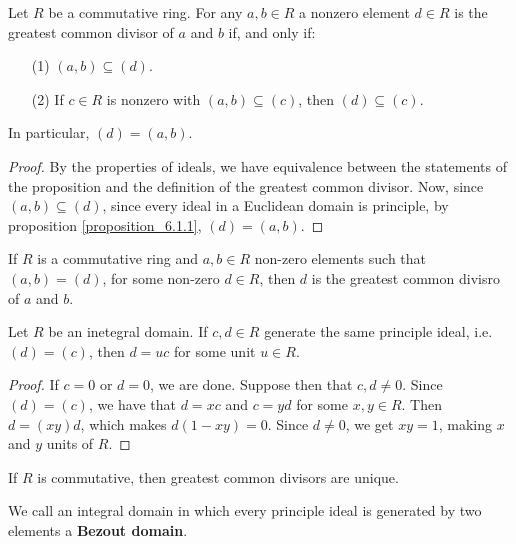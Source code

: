 \begin{proposition}\label{proposition_6.1.2}
  Let $R$ be a commutative ring. For any $a,b \in R$ a nonzero element  $d \in
  R$ is the greatest common divisor of $a$ and $b$ if, and only if:
  \begin{enumerate}
    \item[(1)] $(a,b) \subseteq (d)$.

    \item[(2)] If $c \in R$ is nonzero with $(a,b) \subseteq (c)$, then $(d)
      \subseteq (c)$.
  \end{enumerate}
  In particular, $(d)=(a,b)$.
\end{proposition}
\begin{proof}
  By the properties of ideals, we have equivalence between the
  statements of the proposition and the definition of the greatest common
  divisor. Now, since $(a,b) \subseteq (d)$, since every ideal in a
  Euclidean domain is principle, by proposition \ref{proposition_6.1.1},
  $(d)=(a,b)$.
\end{proof}

\begin{proposition}\label{proposition_6.1.3}
  If $R$ is a commutative ring and $a,b \in R$ non-zero elements such
  that $(a,b)=(d)$, for some non-zero $d \in R$, then $d$ is the
  greatest common divisro of $a$ and $b$.
\end{proposition}

\begin{proposition}\label{proposition_6.1.4}
  Let $R$ be an inetegral domain. If $c,d \in R$ generate the same principle
  ideal, i.e. $(d)=(c)$, then $d=uc$ for some unit  $u \in R$.
\end{proposition}
\begin{proof}
  If $c=0$ or  $d=0$, we are done. Suppose then that  $c,d \neq 0$. Since
  $(d)=(c)$, we have that $d=xc$ and $c=yd$ for some  $x,y \in R$. Then
  $d=(xy)d$, which makes $d(1-xy)=0$. Since $d \neq 0$, we get $xy=1$, making
  $x$ and $y$ units of $R$.
\end{proof}
\begin{corollary}
  If $R$ is commutative, then greatest common divisors are unique.
\end{corollary}

\begin{definition}
  We call an integral domain in which every principle ideal is generated by
  two elements a \textbf{Bezout domain}.
\end{definition}


